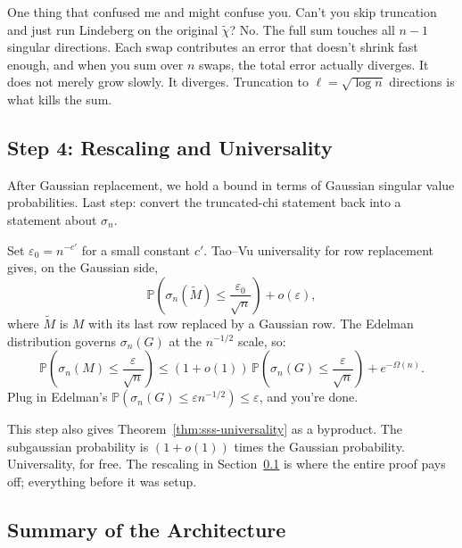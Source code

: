 \documentclass[11pt]{article}
\theoremstyle{definition}
\theoremstyle{remark}
\newcommand{\Prob}{\mathbb{P}}
\begin{document}
One thing that confused me and might confuse you.
Can't you skip truncation and just run Lindeberg on the original $\tilde{\chi}$?
No. The full sum touches all $n-1$ singular directions. Each swap contributes an error that doesn't shrink fast enough, and when you sum over $n$ swaps, the total error actually diverges.
It does not merely grow slowly. It diverges.
Truncation to $\ell = \sqrt{\log n}$ directions is what kills the sum.

\subsection{Step 4: Rescaling and Universality}
\label{sec:rescaling}

After Gaussian replacement, we hold a bound in terms of Gaussian singular value probabilities. Last step: convert the truncated-chi statement back into a statement about $\sigma_n$.

Set $\varepsilon_0 = n^{-c'}$ for a small constant $c'$. Tao--Vu universality for row replacement gives, on the Gaussian side,
\[
  \Prob\!\left(\sigma_n(\tilde{M}) \le \frac{\varepsilon_0}{\sqrt{n}}\right) + o(\varepsilon),
\]
where $\tilde{M}$ is $M$ with its last row replaced by a Gaussian row.
The Edelman distribution governs $\sigma_n(G)$ at the $n^{-1/2}$ scale, so:
\[
  \Prob\!\left(\sigma_n(M) \le \frac{\varepsilon}{\sqrt{n}}\right)
  \le (1 + o(1))\,\Prob\!\left(\sigma_n(G) \le \frac{\varepsilon}{\sqrt{n}}\right)
  + e^{-\Omega(n)}.
\]
Plug in Edelman's $\Prob(\sigma_n(G) \le \varepsilon n^{-1/2}) \le \varepsilon$, and you're done.

This step also gives Theorem~\ref{thm:sss-universality} as a byproduct. The subgaussian probability is $(1 + o(1))$ times the Gaussian probability. Universality, for free. The rescaling in Section~\ref{sec:rescaling} is where the entire proof pays off; everything before it was setup.

\subsection{Summary of the Architecture}
\end{document}

